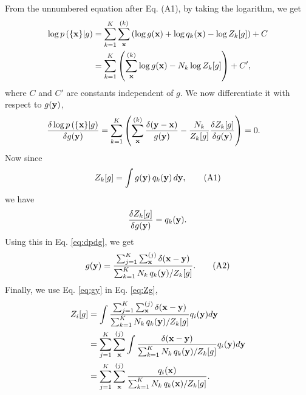 \documentclass[aip,jcp,preprint,notitlepage, superscriptaddress]{revtex4-1}
\begin{document}
From the unnumbered equation after Eq. (A1),
%
by taking the logarithm, we get
%
\begin{align*}
\log p\left( \{ \bm{\mathrm{x}} \} | g \right)
&=
\sum_{k = 1}^K
  \sum_{\bm{\mathrm{x}}}^{(k)}
    \left(
      \log g(\bm{\mathrm{x}}) + \log q_k(\bm{\mathrm{x}}) - \log Z_k[g]
    \right)
+ C
\\
&=
\sum_{k = 1}^K
\left(
  \sum_{\bm{\mathrm{x}}}^{(k)}
    \log g(\bm{\mathrm{x}}) - N_k \log Z_k[g]
\right) + C',
\end{align*}
%
where $C$ and $C'$
are constants independent of $g$.
%
We now differentiate it with respect to $g(\bm{\mathrm{y}})$,
%
\begin{align}
\frac{
  \delta \log p\left( \{ \bm{\mathrm{x}} \} | g \right)
}
{
  \delta g(\bm{\mathrm{y}})
}
&=
\sum_{k = 1}^K
\left(
  \sum_{\bm{\mathrm{x}}}^{(k)}
  \frac{ \delta( \bm{\mathrm{y}} - \bm{\mathrm{x}} ) }
  { g(\bm{\mathrm{y}}) }
  -
  \frac {N_k} { Z_k[g] }
  \frac{ \delta Z_k[g] } { \delta g(\bm{\mathrm{y}}) }
\right)
= 0.
\label{eq:dpdg}
\end{align}
%
Now since
\begin{equation}
Z_k[g]
=
\int g(\bm{\mathrm{y}}) \, q_k(\bm{\mathrm{y}}) \, d\bm{\mathrm{y}},
\tag{A1}
\label{eq:Zg}
\end{equation}
we have
\begin{equation*}
\frac{ \delta Z_k[g] } { \delta g(\bm{\mathrm{y}}) }
= q_k(\bm{\mathrm{y}}).
\end{equation*}
%
Using this in Eq. \eqref{eq:dpdg},
we get
\begin{equation}
g(\bm{\mathrm{y}})
=
\frac{
  \sum_{j = 1}^K \sum_{\bm{\mathrm{x}}}^{(j)} \delta(\bm{\mathrm{x}} - \bm{\mathrm{y}})
}
{
  \sum_{k = 1}^K N_k \, q_k(\bm{\mathrm{y}}) / Z_k[g]
}.
\tag{A2}
\label{eq:gy}
\end{equation}
%
Finally,
we use Eq. \eqref{eq:gy} in Eq. \eqref{eq:Zg},
%
\begin{align}
Z_i[g]
&=
\int
\frac{
  \sum_{j = 1}^K \sum_{\bm{\mathrm{x}}}^{(j)} \delta(\bm{\mathrm{x}} - \bm{\mathrm{y}})
}
{
  \sum_{k = 1}^K N_k \, q_k(\bm{\mathrm{y}}) / Z_k[g]
}
q_i(\bm{\mathrm{y}}) d\bm{\mathrm{y}}
\notag \\
&=
\sum_{j = 1}^K \sum_{\bm{\mathrm{x}}}^{(j)}
\int
\frac{
  \delta(\bm{\mathrm{x}} - \bm{\mathrm{y}})
}
{
  \sum_{k = 1}^K N_k \, q_k(\bm{\mathrm{y}}) / Z_k[g]
}
q_i(\bm{\mathrm{y}}) d\bm{\mathrm{y}}
\notag \\
&=
\sum_{j = 1}^K \sum_{\bm{\mathrm{x}}}^{(j)}
\frac{
  q_i(\bm{\mathrm{x}})
}
{
  \sum_{k = 1}^K N_k \, q_k(\bm{\mathrm{x}}) / Z_k[g]
}.
\end{align}
\end{document}
